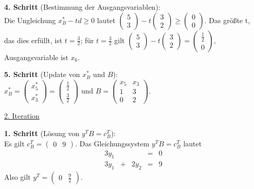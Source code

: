 \documentclass[10pt,a4paper,oneside,ngerman,numbers=noenddot]{scrartcl}
\begin{document}
		\textbf{4. Schritt} (Bestimmung der Ausgangsvariablen):\\
		Die Ungleichung $x_{B}^{*} - td \geq 0$ lautet $\begin{pmatrix} 5 \\ 3 \end{pmatrix} - t \begin{pmatrix}3 \\ 2 \end{pmatrix} \geq \begin{pmatrix} 0 \\ 0 \end{pmatrix}$. Das größte t, das dies erfüllt, ist $t = \frac{3}{2}$; für $t = \frac{3}{2}$ gilt $\begin{pmatrix} 5 \\ 3 \end{pmatrix} - t \begin{pmatrix}3 \\ 2 \end{pmatrix} = \begin{pmatrix} \frac{1}{2} \\ 0 \end{pmatrix}$, Ausgangsvariable ist $x_{6}$.
		
		\textbf{5. Schritt} (Update von $x_{B}^{*}$ und $B$):\\
		$x_{B}^{*} = \begin{pmatrix} x_{5}^{*} \\ x_{3}^{*} \end{pmatrix} = \begin{pmatrix} \frac{1}{2} \\ \frac{3}{2} \end{pmatrix}$ und $B = \begin{pmatrix} x_{5} & x_{3} \\ 1 & 3 \\ 0 & 2 \end{pmatrix}$.
		
		\underline{2. Iteration}
		
		\textbf{1. Schritt} (Lösung von $y^{T}B = c_{B}^{T}$):\\
		Es gilt $c_{B}^{T} = \begin{pmatrix} 0 & 9 \end{pmatrix}$. Das Gleichungssystem $y^{T}B = c_{B}^{T}$ lautet
		\begin{alignat*}{3}
			y_{1} && &=& 0 \\
			3y_{1} &+& 2y_{2} &=& 9
		\end{alignat*}
		Also gilt $y^{T} = \begin{pmatrix} 0 & \frac{9}{2} \end{pmatrix}$.
		
\end{document}
